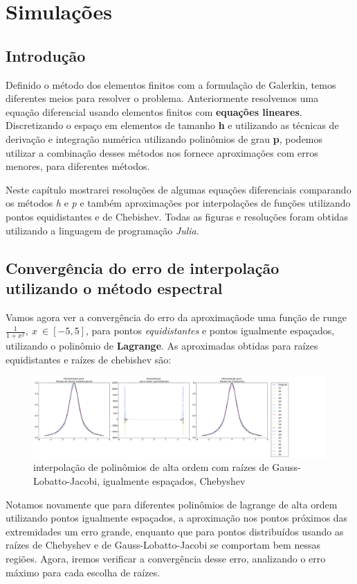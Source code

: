 \chapter{Simulações}   
\label{cap:III}
\section{Introdução}
 Definido o método dos elementos finitos com a formulação de Galerkin, temos diferentes meios para resolver o problema. Anteriormente resolvemos uma equação diferencial usando elementos finitos com \textbf{equações lineares}. Discretizando o espaço em elementos de tamanho \textbf{h} e utilizando as técnicas de derivação e integração numérica utilizando polinômios de grau \textbf{p}, podemos utilizar a combinação desses métodos nos fornece aproximações com erros menores, para diferentes métodos.
 
 Neste capítulo mostrarei resoluções de algumas equações diferenciais comparando os métodos \emph{h} e \emph{p}  e também aproximações por interpolações de funções utilizando pontos equidistantes e de Chebishev. Todas as figuras e resoluções foram obtidas utilizando a linguagem de programação \emph{Julia}.

\section{Convergência do erro de interpolação utilizando o método espectral}
	Vamos agora ver a convergência do erro da aproximaçãode uma função de runge $\frac{1}{1+x^2},\ x\ \in [-5,5]$, para pontos \emph{equidistantes} e pontos igualmente espaçados, utilizando o polinômio de \textbf{Lagrange}.
	As aproximadas obtidas para raízes equidistantes e raízes de chebishev são:\\	
\begin{figure}[!ht]
  \includegraphics[width=1.15\textwidth,center]{figuras/interpolacao_todas.png}
  \caption{interpolação de polinômios de alta ordem com raízes de Gauss-Lobatto-Jacobi, igualmente espaçados, Chebyshev}
\end{figure}
Notamos novamente que para diferentes  polinômios de lagrange de alta ordem utilizando pontos igualmente espaçados, a aproximação nos pontos próximos das extremidades um erro  grande, enquanto que para pontos distribuídos usando as raízes de Chebyshev e de Gauss-Lobatto-Jacobi se comportam bem nessas regiões. Agora, iremos verificar a convergência desse erro, analizando o erro máximo para cada escolha de raízes.

